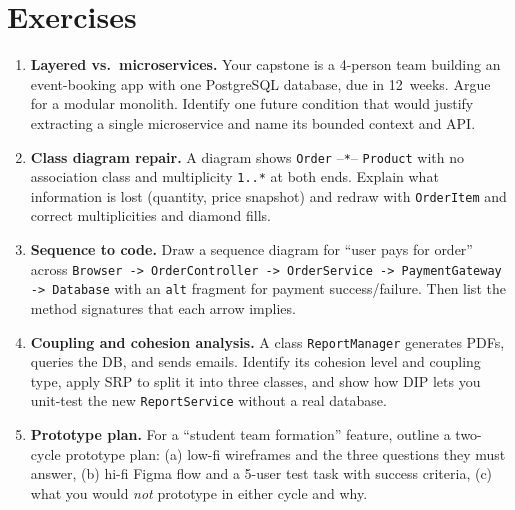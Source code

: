 \section{Exercises}
\label{sec:ch03-exercises}
\begin{enumerate}[label=E3.\arabic*, leftmargin=*, itemsep=0.6em]
    \item \textbf{Layered vs.\ microservices.} Your capstone is a 4-person team building an event-booking app with one PostgreSQL database, due in 12~weeks. Argue for a modular monolith. Identify one future condition that would justify extracting a single microservice and name its bounded context and API.
    \item \textbf{Class diagram repair.} A diagram shows \texttt{Order} --\texttt{*}-- \texttt{Product} with no association class and multiplicity \texttt{1..*} at both ends. Explain what information is lost (quantity, price snapshot) and redraw with \texttt{OrderItem} and correct multiplicities and diamond fills.
    \item {\sloppy \textbf{Sequence to code.} Draw a sequence diagram for ``user pays for order'' across \texttt{Browser -> OrderController -> OrderService -> PaymentGateway -> Database} with an \texttt{alt} fragment for payment success/failure. Then list the method signatures that each arrow implies.\par}
    \item \textbf{Coupling and cohesion analysis.} A class \texttt{ReportManager} generates PDFs, queries the DB, and sends emails. Identify its cohesion level and coupling type, apply SRP to split it into three classes, and show how DIP lets you unit-test the new \texttt{ReportService} without a real database.
    \item \textbf{Prototype plan.} For a ``student team formation'' feature, outline a two-cycle prototype plan: (a) low-fi wireframes and the three questions they must answer, (b) hi-fi Figma flow and a 5-user test task with success criteria, (c) what you would \emph{not} prototype in either cycle and why.
\end{enumerate}
